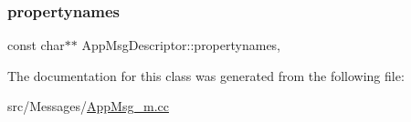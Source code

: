 \subsubsection{\texorpdfstring{propertynames}{propertynames}}
{\footnotesize\ttfamily const char$\ast$$\ast$ App\+Msg\+Descriptor\+::propertynames\hspace{0.3cm}{\ttfamily [mutable]}, {\ttfamily [private]}}



The documentation for this class was generated from the following file\+:\begin{DoxyCompactItemize}
\item 
src/\+Messages/\hyperlink{AppMsg__m_8cc}{App\+Msg\+\_\+m.\+cc}\end{DoxyCompactItemize}
